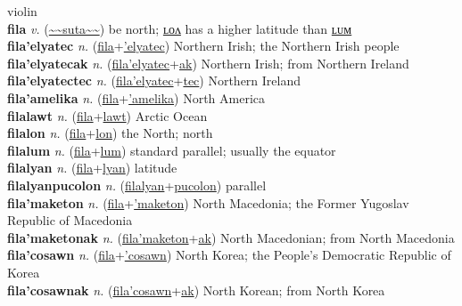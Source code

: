 violin \label{'fiolino} \\
\textbf{fila} \textit{v.} (\hyperref[suta]{\~{}\~{}suta\~{}\~{}})
be north; \hyperref[filalon]{ʟᴏᴧ} has a higher latitude than \hyperref[filalum]{ʟᴜᴍ} \label{fila} \\
\textbf{fila'elyatec} \textit{n.} (\hyperref[fila]{fila}+\hyperref['elyatec]{'elyatec})
Northern Irish; the Northern Irish people \label{fila'elyatec} \\
\textbf{fila'elyatecak} \textit{n.} (\hyperref[fila'elyatec]{fila'elyatec}+\hyperref[ak]{ak})
Northern Irish; from Northern Ireland \label{fila'elyatecak} \\
\textbf{fila'elyatectec} \textit{n.} (\hyperref[fila'elyatec]{fila'elyatec}+\hyperref[tec]{tec})
Northern Ireland \label{fila'elyatectec} \\
\textbf{fila'amelika} \textit{n.} (\hyperref[fila]{fila}+\hyperref['amelika]{'amelika})
North America \label{fila'amelika} \\
\textbf{filalawt} \textit{n.} (\hyperref[fila]{fila}+\hyperref[lawt]{lawt})
Arctic Ocean \label{filalawt} \\
\textbf{filalon} \textit{n.} (\hyperref[fila]{fila}+\hyperref[lon]{lon})
the North; north \label{filalon} \\
\textbf{filalum} \textit{n.} (\hyperref[fila]{fila}+\hyperref[lum]{lum})
standard parallel; usually the equator \label{filalum} \\
\textbf{filalyan} \textit{n.} (\hyperref[fila]{fila}+\hyperref[lyan]{lyan})
latitude \label{filalyan} \\
\textbf{filalyanpucolon} \textit{n.} (\hyperref[filalyan]{filalyan}+\hyperref[pucolon]{pucolon})
parallel \label{filalyanpucolon} \\
\textbf{fila'maketon} \textit{n.} (\hyperref[fila]{fila}+\hyperref['maketon]{'maketon})
North Macedonia; the Former Yugoslav Republic of Macedonia \label{fila'maketon} \\
\textbf{fila'maketonak} \textit{n.} (\hyperref[fila'maketon]{fila'maketon}+\hyperref[ak]{ak})
North Macedonian; from North Macedonia \label{fila'maketonak} \\
\textbf{fila'cosawn} \textit{n.} (\hyperref[fila]{fila}+\hyperref['cosawn]{'cosawn})
North Korea; the People's Democratic Republic of Korea \label{fila'cosawn} \\
\textbf{fila'cosawnak} \textit{n.} (\hyperref[fila'cosawn]{fila'cosawn}+\hyperref[ak]{ak})
North Korean; from North Korea \label{fila'cosawnak} \\
